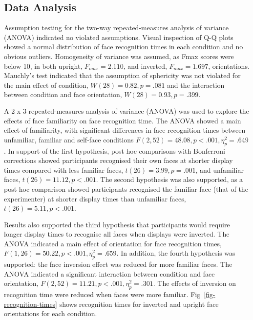 \documentclass[
  10pt,
  letterpaper,
]{article}
\begin{document}
\subsection{Data Analysis}\label{data-analysis}

Assumption testing for the two-way repeated-measures analysis of
variance (ANOVA) indicated no violated assumptions. Visual inspection of
Q-Q plots showed a normal distribution of face recognition times in each
condition and no obvious outliers. Homogeneity of variance was assumed,
as Fmax scores were below 10, in both upright, \(F_{max} = 2.110\), and
inverted, \(F_{max} = 1.697\), orientations. Mauchly's test indicated
that the assumption of sphericity was not violated for the main effect
of condition, \(W(28) = 0.82, p = .081\) and the interaction between
condition and face orientation, \(W(28) = 0.93, p = .399\).

A 2 x 3 repeated-measures analysis of variance (ANOVA) was used to
explore the effects of face familiarity on face recognition time. The
ANOVA showed a main effect of familiarity, with significant differences
in face recognition times between unfamiliar, familiar and self-face
conditions \(F(2, 52) = 48.08, p < .001, \eta_p^2 = .649\). In support
of the first hypothesis, post hoc comparisons with Bonferroni
corrections showed participants recognised their own faces at shorter
display times compared with less familiar faces,
\(t(26) = 3.99, p = .001\), and unfamiliar faces,
\(t(26) = 11.12, p < .001\). The second hypothesis was also supported,
as a post hoc comparison showed participants recognised the familiar
face (that of the experimenter) at shorter display times than unfamiliar
faces, \(t(26) = 5.11, p < .001\).

Results also supported the third hypothesis that participants would
require longer display times to recognise all faces when displays were
inverted. The ANOVA indicated a main effect of orientation for face
recognition times, \(F(1, 26) = 50.22, p <.001, \eta_p^2 = .659\). In
addition, the fourth hypothesis was supported: the face inversion effect
was reduced for more familiar faces. The ANOVA indicated a significant
interaction between condition and face orientation,
\(F(2, 52) = 11.21, p < .001, \eta_p^2 = .301\). The effects of
inversion on recognition time were reduced when faces were more
familiar. Fig~\ref{fig-recognition-times} shows recognition times for
inverted and upright face orientations for each condition.
\end{document}

